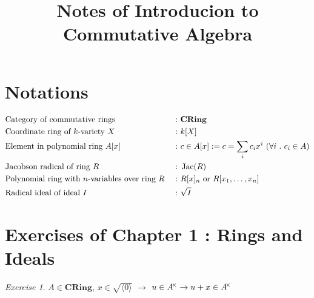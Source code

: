 \documentclass[a4paper]{article}
\theoremstyle{plain}
\theoremstyle{definition}
\theoremstyle{remark}
\newtheorem{ex}{Exercise}[section]
\newcommand{\mbf}[1]{\mathbf{#1}}
\newcommand{\unitgrp}[1]{#1^{\mspace{-4mu}\times}}
\newcommand{\gen}[1]{\langle #1 \rangle}
\newcommand{\A}{\forall}
\DeclareMathOperator{\Jac}{\rm{Jac}}
\begin{document}
    \title{Notes of Introducion to Commutative Algebra}
    \author{{\color{pink}{Cloudi}}{\color{Aquamarine}{fold}}}
    \maketitle
    \newpage

    \setcounter{section}{-1}

    \section{Notations}

    \vspace*{0.3cm}

    \begin{align*}
        & \text{Category of commutative rings }      &: \ & \mbf{CRing}\\
        & \text{Coordinate ring of $k$-variety $X$ } &: \ & k[X]\\
        & \text{Element in polynomial ring $A[x]$ }  &: \ & c \in A[x] := c=\sum_{i}c_i x^i \ (\A i \ .\ c_i \in A)\\
        & \text{Jacobson radical of ring $R$ }       &: \ & \Jac(R)\\
        & \text{Polynomial ring with $n$-variables over ring $R$ } &: \ & R[x]_n \text{ or } R[x_1, \dotsc, x_n]\\
        & \text{Radical ideal of ideal $I$ }         &: \ & \sqrt{I}\\
    \end{align*}


    \section{Exercises of Chapter 1 : Rings and Ideals}

    \vspace*{0.9cm}
    
    \begin{ex}
        $A \in \mbf{CRing} $, $x \in \sqrt{\gen{0}}$ $\to$ $u \in \unitgrp{A} \to u+x \in \unitgrp{A}$
    \end{ex}
\end{document}
